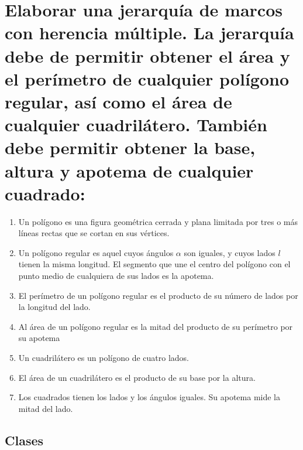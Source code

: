 \documentclass[10pt, a4paper,spanish]{article}
\begin{document}
			\paragraph{}



	\section{Elaborar una jerarquía de marcos con herencia múltiple. La jerarquía debe de permitir obtener el área y el perímetro de cualquier polígono regular, así como el área de cualquier cuadrilátero. También debe permitir obtener la base, altura y apotema de cualquier cuadrado:}


		\begin{enumerate}[label=\alph*)]

			\item Un polígono es una figura geométrica cerrada y plana limitada por tres o más líneas rectas que se cortan en sus vértices.

			\item Un polígono regular es aquel cuyos ángulos $\alpha$ son iguales, y cuyos lados $l$ tienen la misma longitud. El segmento que une el centro del polígono con el punto medio de cualquiera de sus lados es la apotema.

			\item El perímetro de un polígono regular es el producto de su número de lados por la longitud del lado.

			\item Al área de un polígono regular es la mitad del producto de su perímetro por su apotema

			\item Un cuadrilátero es un polígono de cuatro lados.

			\item El área de un cuadrilátero es el producto de su base por la altura.

			\item Los cuadrados tienen los lados y los ángulos iguales. Su apotema mide la mitad del lado.

		\end{enumerate}


		\paragraph{}


    \subsection{Clases}
\end{document}
